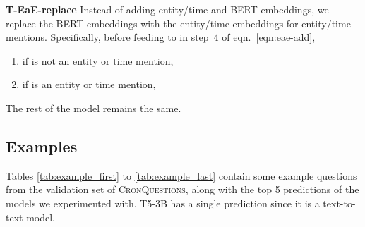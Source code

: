 \documentclass[11pt,a4paper]{article}
\newcommand{\dataset}{\textsc{CronQuestions}}
\begin{document}
\textbf{T-EaE-replace} Instead of adding entity/time and BERT embeddings, we replace the BERT embeddings with the entity/time embeddings for entity/time mentions. Specifically, before feeding to  in step~4 of eqn.~\ref{eqn:eae-add},
\begin{enumerate}
    \item if  is not an entity or time mention, 
    \item if  is an entity or time mention, 
\end{enumerate}
The rest of the model remains the same.

\subsection{Examples}
Tables \ref{tab:example_first} to \ref{tab:example_last} contain some example questions from the validation set of \dataset{}, along with the top 5 predictions of the models we experimented with. T5-3B has a single prediction since it is a text-to-text model.
\end{document}
